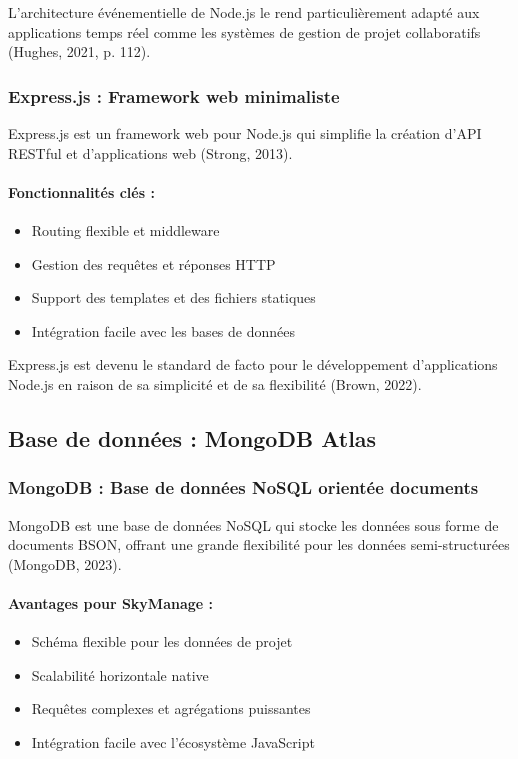 L'architecture événementielle de Node.js le rend particulièrement adapté aux applications temps réel comme les systèmes de gestion de projet collaboratifs (Hughes, 2021, p. 112).

\subsubsection{Express.js : Framework web minimaliste}
Express.js est un framework web pour Node.js qui simplifie la création d'API RESTful et d'applications web (Strong, 2013).

\paragraph{Fonctionnalités clés :}
\begin{itemize}
    \item Routing flexible et middleware
    \item Gestion des requêtes et réponses HTTP
    \item Support des templates et des fichiers statiques
    \item Intégration facile avec les bases de données
\end{itemize}

Express.js est devenu le standard de facto pour le développement d'applications Node.js en raison de sa simplicité et de sa flexibilité (Brown, 2022).

\subsection{Base de données : MongoDB Atlas}

\subsubsection{MongoDB : Base de données NoSQL orientée documents}
MongoDB est une base de données NoSQL qui stocke les données sous forme de documents BSON, offrant une grande flexibilité pour les données semi-structurées (MongoDB, 2023).

\paragraph{Avantages pour SkyManage :}
\begin{itemize}
    \item Schéma flexible pour les données de projet
    \item Scalabilité horizontale native
    \item Requêtes complexes et agrégations puissantes
    \item Intégration facile avec l'écosystème JavaScript
\end{itemize}

